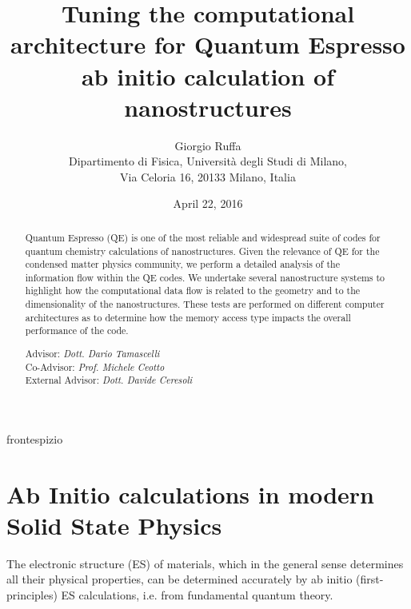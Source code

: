\documentclass[a4paper,12pt]{article}
\begin{document}
\title{\bf \Huge Tuning the computational architecture for Quantum Espresso ab initio calculation of nanostructures }


\author{Giorgio Ruffa\\
Dipartimento di Fisica, Universit\`a degli Studi di Milano,\\
Via Celoria 16, 20133 Milano, Italia
}
\date{April 22, 2016} %


 {frontespizio} %

\newpage\qquad
\newpage

\maketitle

\begin{abstract}

Quantum Espresso (QE) is one of the most reliable and widespread  suite of codes for quantum chemistry calculations of nanostructures. Given the relevance of QE for the condensed matter physics community, we perform a detailed analysis of the information flow within the QE codes. We undertake several nanostructure systems to highlight how the computational data flow is related to the geometry and to the dimensionality of the nanostructures. These tests are performed on different computer architectures as to determine how the memory access type impacts the overall performance of the code.

\vskip0.75cm
\hskip5cm
\parbox[t]{7cm}
{
Advisor: {\it Dott. Dario Tamascelli}\\
Co-Advisor: {\it Prof. Michele Ceotto}\\
External Advisor: {\it Dott. Davide Ceresoli}\\
}
\end{abstract}

\newpage
\tableofcontents
\newpage


\section{Ab Initio calculations in modern Solid State Physics}
The electronic structure (ES) of materials, which in the general  sense  determines  all  their  physical  properties,  can be  determined  accurately  by  ab  initio  (first-principles)  ES calculations,  i.e.  from  fundamental  quantum  theory.
\end{document}
